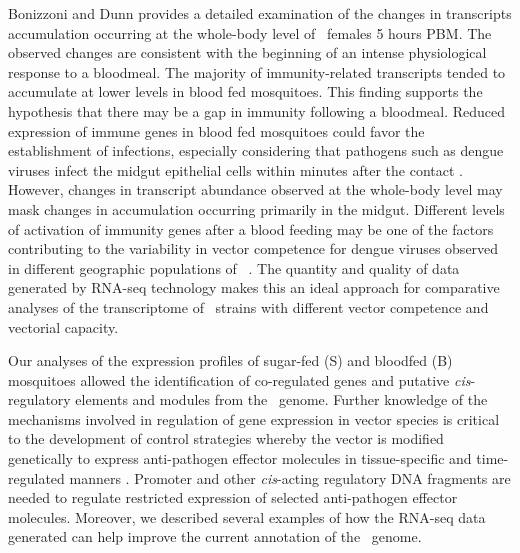 Bonizzoni and Dunn \cite{Bonizzoni2011} provides a detailed examination of the changes in transcripts accumulation occurring at the whole-body level of \Aa\  females 5 hours \gls{PBM}. The observed changes are consistent with the beginning of an intense physiological response to a bloodmeal. The majority of immunity-related transcripts tended to accumulate at lower levels in blood fed mosquitoes. This finding supports the hypothesis that there may be a gap in immunity following a bloodmeal. Reduced expression of immune genes in blood fed mosquitoes could favor the establishment of infections, especially considering that pathogens such as dengue viruses infect the midgut epithelial cells within minutes after the contact \cite{Salazar2007}. However, changes in transcript abundance observed at the whole-body level may mask changes in accumulation occurring primarily in the midgut. Different levels of activation of immunity genes after a blood feeding may be one of the factors contributing to the variability in vector competence for dengue viruses observed in different geographic populations of \Aa\  \cite{Bennet2002,Black2002}. The quantity and quality of data generated by RNA-seq technology makes this an ideal approach for comparative analyses of the transcriptome of \Aa\ strains with different vector competence and vectorial capacity.

Our analyses of the expression profiles of sugar-fed (S) and bloodfed (B) mosquitoes allowed the identification of co-regulated genes and putative \textit{cis}-regulatory elements and modules from the \Aa\  genome. Further knowledge of the mechanisms involved in regulation of gene expression in vector species is critical to the development of control strategies whereby the vector is modified genetically to express anti-pathogen effector molecules in tissue-specific and time-regulated manners \cite{Terenius2008}. Promoter and other \textit{cis}-acting regulatory DNA fragments are needed to regulate restricted expression of selected anti-pathogen effector molecules. Moreover, we described several examples of how the RNA-seq data generated can help improve the current annotation of the \Aa\  genome.

